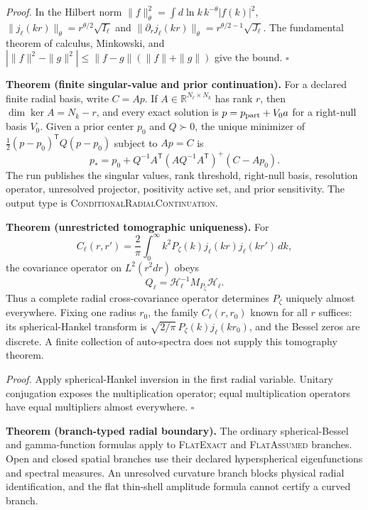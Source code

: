 \textit{Proof.}
In the Hilbert norm
$\|f\|_\theta^2=\int d\ln k\,k^{-\theta}|f(k)|^2$,
$\|j_\ell(kr)\|_\theta=r^{\theta/2}\sqrt{I_\ell}$ and
$\|\partial_rj_\ell(kr)\|_\theta=r^{\theta/2-1}\sqrt{J_\ell}$.
The fundamental theorem of calculus, Minkowski, and
$|\|f\|^2-\|g\|^2|\le\|f-g\|(\|f\|+\|g\|)$ give the bound.  \hfill$\square$

\textbf{Theorem (finite singular-value and prior continuation).}
\label{thm:oph330-finite-prior-continuation}
For a declared finite radial basis, write \(C=Ap\). If
\(A\in\mathbb R^{N_\ell\times N_k}\) has rank \(r\), then
\(\dim\ker A=N_k-r\), and every exact solution is
\(p=p_{\rm part}+V_0a\) for a right-null basis \(V_0\). Given a prior center
\(p_0\) and \(Q\succ0\), the unique minimizer of
\(\frac12(p-p_0)^{\mathsf T}Q(p-p_0)\) subject to \(Ap=C\) is
\[
\boxed{
p_*=p_0+Q^{-1}A^{\mathsf T}
(AQ^{-1}A^{\mathsf T})^+(C-Ap_0).}
\]
The run publishes the singular values, rank threshold, right-null basis,
resolution operator, unresolved projector, positivity active set, and prior
sensitivity. The output type is \textsc{ConditionalRadialContinuation}.

\textbf{Theorem (unrestricted tomographic uniqueness).}
\label{thm:oph330-radial-tomography}
For
\[
 C_\ell(r,r')=\frac2\pi\int_0^\infty k^2P_\zeta(k)
 j_\ell(kr)j_\ell(kr')\,dk,
\]
the covariance operator on $L^2(r^2dr)$ obeys
\[
 Q_\ell=\mathcal H_\ell^{-1}M_{P_\zeta}\mathcal H_\ell.
\]
Thus a complete radial cross-covariance operator determines $P_\zeta$ uniquely
almost everywhere.  Fixing one radius $r_0$, the family $C_\ell(r,r_0)$ known for
all $r$ suffices: its spherical-Hankel transform is
$\sqrt{2/\pi}\,P_\zeta(k)j_\ell(kr_0)$, and the Bessel zeros are discrete.
A finite collection of auto-spectra does not supply this tomography theorem.

\textit{Proof.}
Apply spherical-Hankel inversion in the first radial variable.  Unitary
conjugation exposes the multiplication operator; equal multiplication operators
have equal multipliers almost everywhere.  \hfill$\square$

\textbf{Theorem (branch-typed radial boundary).}
\label{thm:oph330-branch-typed-radial-boundary}
The ordinary spherical-Bessel and gamma-function formulas apply to
\textsc{FlatExact} and \textsc{FlatAssumed} branches. Open and closed spatial
branches use their declared hyperspherical eigenfunctions and spectral
measures. An unresolved curvature branch blocks physical radial
identification, and
the flat thin-shell amplitude formula cannot certify a curved branch.

